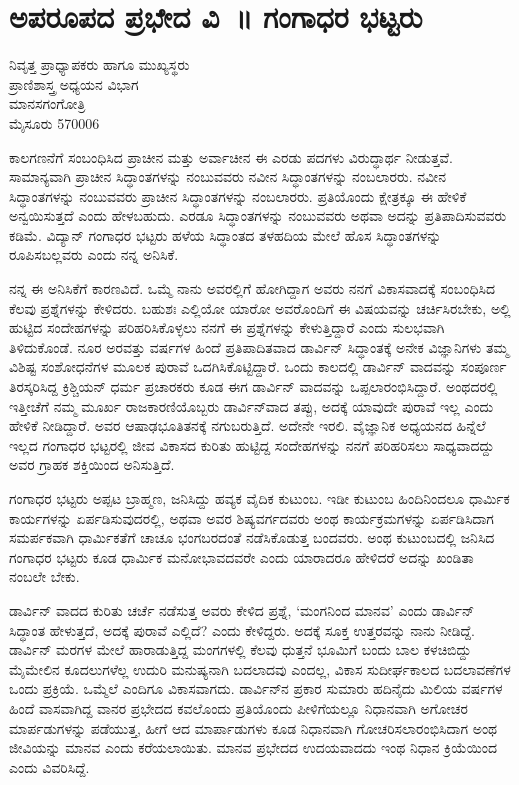{\fontsize{14}{16}\selectfont
\chapter{ಅಪರೂಪದ ಪ್ರಭೇದ ವಿ~॥ ಗಂಗಾಧರ ಭಟ್ಟರು}

\begin{center}
\smallskip

ನಿವೃತ್ತ ಪ್ರಾಧ್ಯಾಪಕರು ಹಾಗೂ ಮುಖ್ಯಸ್ಥರು\\
ಪ್ರಾಣಿಶಾಸ್ತ್ರ ಅಧ್ಯಯನ ವಿಭಾಗ\\ 
ಮಾನಸಗಂಗೋತ್ರಿ\\ 
ಮೈಸೂರು   \enginline{-}   570006
\addrule
\end{center}

ಕಾಲಗಣನೆಗೆ ಸಂಬಂಧಿಸಿದ ಪ್ರಾಚೀನ ಮತ್ತು ಅರ್ವಾಚೀನ ಈ ಎರಡು ಪದಗಳು ವಿರುದ್ಧಾರ್ಥ ನೀಡುತ್ತವೆ.  ಸಾಮಾನ್ಯವಾಗಿ ಪ್ರಾಚೀನ ಸಿದ್ಧಾಂತಗಳನ್ನು ನಂಬು\-ವವರು ನವೀನ ಸಿದ್ಧಾಂತಗಳನ್ನು ನಂಬಲಾರರು.  ನವೀನ ಸಿದ್ಧಾಂತಗಳನ್ನು ನಂಬು\-ವವರು ಪ್ರಾಚೀನ ಸಿದ್ಧಾಂತಗಳನ್ನು ನಂಬಲಾರರು.  ಪ್ರತಿಯೊಂದು ಕ್ಷೇತ್ರಕ್ಕೂ ಈ ಹೇಳಿಕೆ ಅನ್ವಯಿ\-ಸುತ್ತದೆ ಎಂದು ಹೇಳಬಹುದು.  ಎರಡೂ ಸಿದ್ಧಾಂತಗಳನ್ನು ನಂಬುವವರು ಅಥವಾ ಅದನ್ನು ಪ್ರತಿಪಾದಿಸುವವರು ಕಡಿಮೆ.  ವಿದ್ಯಾನ್ ಗಂಗಾಧರ ಭಟ್ಟರು ಹಳೆಯ ಸಿದ್ಧಾಂತದ ತಳಹದಿಯ ಮೇಲೆ ಹೊಸ ಸಿದ್ಧಾಂತಗಳನ್ನು ರೂಪಿಸಬಲ್ಲವರು ಎಂದು ನನ್ನ ಅನಿಸಿಕೆ.  

ನನ್ನ ಈ ಅನಿಸಿಕೆಗೆ ಕಾರಣವಿದೆ.  ಒಮ್ಮೆ ನಾನು ಅವರಲ್ಲಿಗೆ ಹೋಗಿದ್ದಾಗ ಅವರು ನನಗೆ ವಿಕಾಸವಾದಕ್ಕೆ ಸಂಬಂಧಿಸಿದ ಕೆಲವು ಪ್ರಶ್ನೆಗಳನ್ನು ಕೇಳಿದರು.  ಬಹುಶಃ ಎಲ್ಲಿಯೋ ಯಾರೋ ಅವರೊಂದಿಗೆ ಈ ವಿಷಯವನ್ನು ಚರ್ಚಿಸಿರಬೇಕು, ಅಲ್ಲಿ ಹುಟ್ಟಿದ ಸಂದೇಹಗಳನ್ನು ಪರಿಹರಿಸಿಕೊಳ್ಳಲು ನನಗೆ ಈ ಪ್ರಶ್ನೆಗಳನ್ನು ಕೇಳುತ್ತಿದ್ದಾರೆ ಎಂದು ಸುಲಭವಾಗಿ ತಿಳಿದುಕೊಂಡೆ.  ನೂರ ಅರವತ್ತು ವರ್ಷಗಳ ಹಿಂದೆ ಪ್ರತಿಪಾದಿತವಾದ ಡಾರ್ವಿನ್ ಸಿದ್ಧಾಂತಕ್ಕೆ ಅನೇಕ ವಿಜ್ಞಾನಿಗಳು ತಮ್ಮ ವಿಶಿಷ್ಟ ಸಂಶೋಧನೆಗಳ ಮೂಲಕ ಪುರಾವೆ ಒದಗಿಸಿ\-ಕೊಟ್ಟಿದ್ದಾರೆ.  ಒಂದು ಕಾಲದಲ್ಲಿ ಡಾರ್ವಿನ್ ವಾದವನ್ನು ಸಂಪೂರ್ಣ ತಿರಸ್ಕರಿಸಿದ್ದ ಕ್ರಿಶ್ಚಿಯನ್ ಧರ್ಮ ಪ್ರಚಾರಕರು ಕೂಡ ಈಗ ಡಾರ್ವಿನ್ ವಾದವನ್ನು ಒಪ್ಪಲಾರಂಭಿಸಿದ್ದಾರೆ.  ಅಂಥದರಲ್ಲಿ ಇತ್ತೀಚೆಗೆ ನಮ್ಮ ಮೂರ್ಖ ರಾಜಕಾರಣಿಯೊಬ್ಬರು ಡಾರ್ವಿನ್‍ವಾದ ತಪ್ಪು, ಅದಕ್ಕೆ ಯಾವುದೇ ಪುರಾವೆ ಇಲ್ಲ ಎಂದು ಹೇಳಿಕೆ ನೀಡಿದ್ದಾರೆ.  ಅವರ ಆಷಾಢಭೂತಿತನಕ್ಕೆ ನಗುಬರುತ್ತಿದೆ.  ಅದೇನೇ ಇರಲಿ.  ವೈಜ್ಞಾನಿಕ ಅಧ್ಯಯನದ ಹಿನ್ನೆಲೆ ಇಲ್ಲದ ಗಂಗಾಧರ ಭಟ್ಟರಲ್ಲಿ ಜೀವ ವಿಕಾಸದ ಕುರಿತು ಹುಟ್ಟಿದ್ದ ಸಂದೇಹಗಳನ್ನು ನನಗೆ ಪರಿಹರಿಸಲು ಸಾಧ್ಯವಾದದ್ದು ಅವರ ಗ್ರಾಹಕ ಶಕ್ತಿಯಿಂದ ಅನಿಸುತ್ತಿದೆ.  

ಗಂಗಾಧರ ಭಟ್ಟರು ಅಪ್ಪಟ ಬ್ರಾಹ್ಮಣ, ಜನಿಸಿದ್ದು ಹವ್ಯಕ ವೈದಿಕ ಕುಟುಂಬ.  ಇಡೀ ಕುಟುಂಬ ಹಿಂದಿನಿಂದಲೂ ಧಾರ್ಮಿಕ ಕಾರ್ಯಗಳನ್ನು ಏರ್ಪಡಿಸುವುದರಲ್ಲಿ, ಅಥವಾ ಅವರ ಶಿಷ್ಯವರ್ಗದವರು ಅಂಥ ಕಾರ್ಯಕ್ರಮಗಳನ್ನು ಏರ್ಪಡಿಸಿದಾಗ ಸಮರ್ಪಕ\-ವಾಗಿ ಧಾರ್ಮಿಕತೆಗೆ ಚಾಚೂ ಭಂಗಬರದಂತೆ ನಡೆಸಿಕೊಡುತ್ತ ಬಂದವರು.  ಅಂಥ ಕುಟುಂಬದಲ್ಲಿ ಜನಿಸಿದ ಗಂಗಾಧರ ಭಟ್ಟರು ಕೂಡ ಧಾರ್ಮಿಕ ಮನೋಭಾವದವರೇ ಎಂದು ಯಾರಾದರೂ ಹೇಳಿದರೆ ಅದನ್ನು ಖಂಡಿತಾ ನಂಬಲೇ ಬೇಕು.  

ಡಾರ್ವಿನ್ ವಾದದ ಕುರಿತು ಚರ್ಚೆ ನಡೆಸುತ್ತ ಅವರು ಕೇಳಿದ ಪ್ರಶ್ನೆ, ‘ಮಂಗನಿಂದ ಮಾನವ’ ಎಂದು ಡಾರ್ವಿನ್ ಸಿದ್ಧಾಂತ ಹೇಳುತ್ತದೆ, ಅದಕ್ಕೆ ಪುರಾವೆ ಎಲ್ಲಿದೆ?  ಎಂದು ಕೇಳಿದ್ದರು.  ಅದಕ್ಕೆ ಸೂಕ್ತ ಉತ್ತರವನ್ನು ನಾನು ನೀಡಿದ್ದೆ.  ಡಾರ್ವಿನ್ ಮರಗಳ ಮೇಲೆ ಹಾರಾಡುತ್ತಿದ್ದ ಮಂಗಗಳಲ್ಲಿ ಕೆಲವು ಧುತ್ತನೆ ಭೂಮಿಗೆ ಬಂದು ಬಾಲ ಕಳಚಿಬಿದ್ದು ಮೈಮೇಲಿನ ಕೂದಲುಗಳೆಲ್ಲ ಉದುರಿ ಮನುಷ್ಯನಾಗಿ ಬದಲಾದವು ಎಂದಲ್ಲ,  ವಿಕಾಸ ಸುದೀರ್ಘಕಾಲದ ಬದಲಾವಣೆಗಳ ಒಂದು ಪ್ರಕ್ರಿಯೆ.  ಒಮ್ಮೆಲೆ ಎಂದಿಗೂ ವಿಕಾಸ\-ವಾಗದು.  ಡಾರ್ವಿನ್‍ನ ಪ್ರಕಾರ ಸುಮಾರು ಹದಿನೈದು ಮಿಲಿಯ ವರ್ಷಗಳ ಹಿಂದೆ ವಾಸವಾಗಿದ್ದ ವಾನರ ಪ್ರಭೇದದ ಕವಲೊಂದು ಪ್ರತಿಯೊಂದು ಪೀಳಿಗೆಯಲ್ಲೂ ನಿಧಾನವಾಗಿ ಅಗೋಚರ  ಮಾರ್ಪಡುಗಳನ್ನು ಪಡೆಯುತ್ತ, ಹೀಗೆ ಆದ ಮಾರ್ಪಾಡುಗಳು ಕೂಡ ನಿಧಾನವಾಗಿ ಗೋಚರಿಸಲಾರಂಭಿಸಿದಾಗ ಅಂಥ ಜೀವಿಯನ್ನು ಮಾನವ ಎಂದು ಕರೆಯ\-ಲಾಯಿತು.  ಮಾನವ ಪ್ರಭೇದದ ಉದಯವಾದದು ಇಂಥ ನಿಧಾನ ಕ್ರಿಯೆಯಿಂದ ಎಂದು ವಿವರಿಸಿದ್ದೆ.  

}
